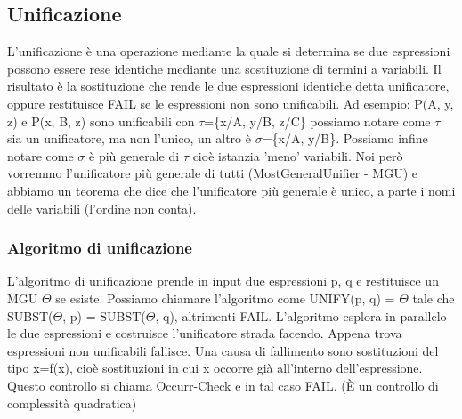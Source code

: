 \documentclass{article}
\begin{document}
\subsection{Unificazione}
L'unificazione è una operazione mediante la quale si determina se due espressioni possono essere rese identiche mediante una sostituzione di termini a variabili. Il risultato è la sostituzione che rende le due espressioni identiche detta unificatore, oppure restituisce FAIL se le espressioni non sono unificabili. \newline
Ad esempio: P(A, y, z) e P(x, B, z) sono unificabili con $\tau$=\{x/A, y/B, z/C\} possiamo notare come $\tau$ sia un unificatore, ma non l'unico, un altro è $\sigma$=\{x/A, y/B\}. Possiamo infine notare come $\sigma$ è più generale di $\tau$ cioè istanzia 'meno' variabili. Noi però vorremmo l’unificatore più generale di tutti (MostGeneralUnifier - MGU) e abbiamo un teorema che dice che l’unificatore più generale è unico, a parte i nomi delle variabili (l’ordine non conta).

\subsubsection{Algoritmo di unificazione}
L’algoritmo di unificazione prende in input due espressioni p, q e restituisce un MGU $\Theta$ se esiste. Possiamo chiamare l'algoritmo come UNIFY(p, q) = $\Theta$ tale che SUBST($\Theta$, p) = SUBST($\Theta$, q), altrimenti FAIL. L’algoritmo esplora in parallelo le due espressioni e costruisce l’unificatore strada facendo. Appena trova espressioni non unificabili fallisce. Una causa di fallimento sono sostituzioni del tipo x=f(x), cioè sostituzioni in cui x occorre già all'interno dell'espressione. Questo controllo si chiama Occurr-Check e in tal caso FAIL. (È un controllo di complessità quadratica)
\end{document}
